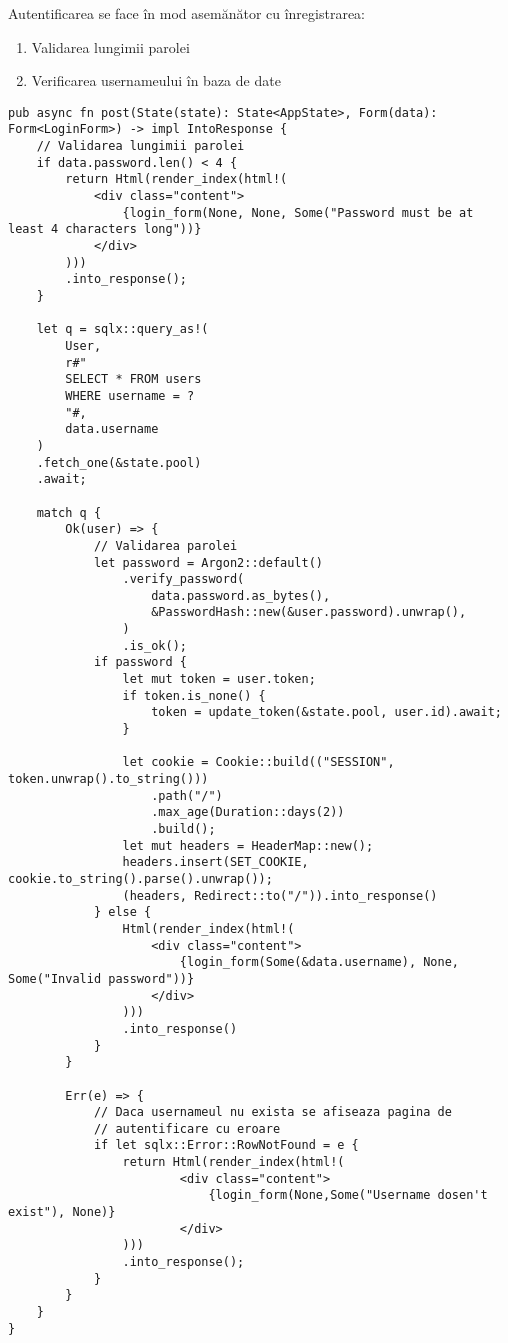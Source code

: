 \newpage
Autentificarea se face în mod asemănător cu înregistrarea:
\begin{enumerate}

	\item Validarea lungimii parolei

	\item Verificarea usernameului în baza de date

\end{enumerate}

\begin{lstlisting}[language=RustHtml]
pub async fn post(State(state): State<AppState>, Form(data): Form<LoginForm>) -> impl IntoResponse {
    // Validarea lungimii parolei
    if data.password.len() < 4 {
        return Html(render_index(html!(
            <div class="content">
                {login_form(None, None, Some("Password must be at least 4 characters long"))}
            </div>
        )))
        .into_response();
    }

    let q = sqlx::query_as!(
        User,
        r#"
        SELECT * FROM users
        WHERE username = ? 
        "#,
        data.username
    )
    .fetch_one(&state.pool)
    .await;

    match q {
        Ok(user) => {
            // Validarea parolei
            let password = Argon2::default()
                .verify_password(
                    data.password.as_bytes(),
                    &PasswordHash::new(&user.password).unwrap(),
                )
                .is_ok();
            if password {
                let mut token = user.token;
                if token.is_none() {
                    token = update_token(&state.pool, user.id).await;
                }

                let cookie = Cookie::build(("SESSION", token.unwrap().to_string()))
                    .path("/")
                    .max_age(Duration::days(2))
                    .build();
                let mut headers = HeaderMap::new();
                headers.insert(SET_COOKIE, cookie.to_string().parse().unwrap());
                (headers, Redirect::to("/")).into_response()
            } else {
                Html(render_index(html!(
                    <div class="content">
                        {login_form(Some(&data.username), None, Some("Invalid password"))}
                    </div>
                )))
                .into_response()
            }
        }

        Err(e) => {
            // Daca usernameul nu exista se afiseaza pagina de 
            // autentificare cu eroare
            if let sqlx::Error::RowNotFound = e {
                return Html(render_index(html!(
                        <div class="content">
                            {login_form(None,Some("Username dosen't exist"), None)}
                        </div>
                )))
                .into_response();
            }
        }
    }
}
\end{lstlisting}
